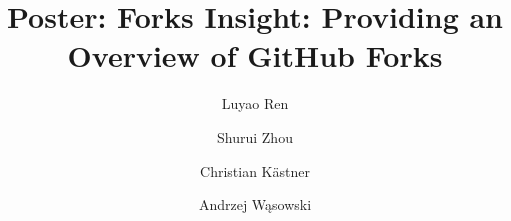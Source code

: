 \documentclass[sigconf]{acmart}
\newcommand{\Luyao}[1]{\textcolor{red}{(Luyao: #1)}}
\begin{document}
\title{Poster: Forks Insight: Providing an Overview of GitHub Forks}

	\author{Luyao Ren}

	\author{Shurui Zhou}
	
	\author{Christian K\"{a}stner} 

	
    \author{Andrzej W\k{a}sowski}


	\renewcommand{\shortauthors}{L. Ren et al.}
	

%


\maketitle



 
\end{document}
